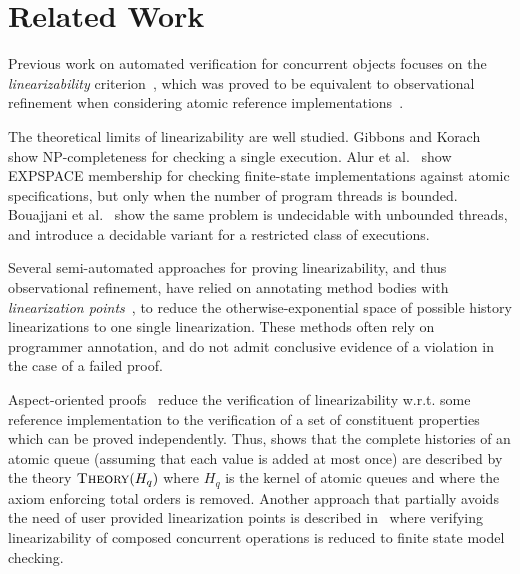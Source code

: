 \section{Related Work}
\label{sec:related}


Previous work on automated verification for concurrent objects focuses on the
\emph{linearizability} criterion~\citep{journals/toplas/HerlihyW90},
which was proved to be equivalent to observational refinement 
when considering atomic reference implementations~\cite{journals/tcs/FilipovicORY10,conf/popl/BouajjaniEEH15}. 

The theoretical limits of linearizability are well studied. Gibbons
and Korach~\cite{journals/siamcomp/GibbonsK97} show NP-completeness for
checking a single execution. Alur et al.~\cite{journals/iandc/AlurMP00} show
EXPSPACE membership for checking finite-state implementations against atomic
specifications, but only when the number of program threads is bounded.
Bouajjani et al.~\cite{conf/esop/BouajjaniEEH13} show the same problem is
undecidable with unbounded threads, and introduce a decidable variant for a
restricted class of executions.


Several semi-automated approaches for proving linearizability, and thus
observational refinement, have relied on annotating method bodies with
\emph{linearization points}~\cite{conf/tacas/AbdullaHHJR13,conf/cav/AmitRRSY07,DBLP:conf/cav/DragoiGH13,conf/fm/LiuCLS09,
conf/podc/OHearnRVYY10, conf/cav/Vafeiadis10, conf/icse/Zhang11a}, to reduce the otherwise-exponential
space of possible history linearizations to one single linearization. These
methods often rely on programmer annotation, and do not admit conclusive
evidence of a violation in the case of a failed proof.

Aspect-oriented proofs~\cite{conf/concur/HenzingerSV13} reduce the verification
of linearizability w.r.t. some reference implementation 
to the verification of a set of constituent properties which can be proved independently.
Thus, \cite{conf/concur/HenzingerSV13} shows that the complete histories
of an atomic queue (assuming that each value is added at most once) are described
by the theory $\textsc{Theory}(H_q)$ where $H_q$ is the kernel of atomic queues
and where the axiom enforcing total orders is removed.
Another approach that partially avoids the need of user provided linearization points
is described in~\cite{DBLP:conf/issta/ShachamYGABSV14} where verifying linearizability
of composed concurrent operations is reduced to finite state model checking.

